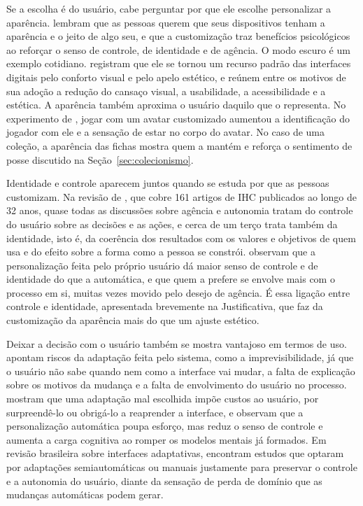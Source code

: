 Se a escolha é do usuário, cabe perguntar por que ele escolhe personalizar a aparência.  lembram que as pessoas querem que seus
dispositivos tenham a aparência e o jeito de algo seu, e que a customização traz benefícios psicológicos ao reforçar o senso de controle, de identidade e de
agência. O modo escuro é um exemplo cotidiano.  registram que ele se tornou um recurso padrão das interfaces digitais pelo conforto visual e
pelo apelo estético, e  reúnem entre os motivos de sua adoção a redução do cansaço visual, a usabilidade, a acessibilidade e a
estética. A aparência também aproxima o usuário daquilo que o representa. No experimento de , jogar com um avatar customizado aumentou a
identificação do jogador com ele e a sensação de estar no corpo do avatar. No caso de uma coleção, a aparência das fichas mostra quem a mantém e reforça o
sentimento de posse discutido na Seção~\ref{sec:colecionismo}.

Identidade e controle aparecem juntos quando se estuda por que as pessoas customizam. Na revisão de , que cobre 161 artigos de IHC
publicados ao longo de 32 anos, quase todas as discussões sobre agência e autonomia tratam do controle do usuário sobre as decisões e as ações, e cerca de um
terço trata também da identidade, isto é, da coerência dos resultados com os valores e objetivos de quem usa e do efeito sobre a forma como a pessoa se
constrói.  observam que a personalização feita pelo próprio usuário dá maior senso de controle e de identidade do que a automática, e que
quem a prefere se envolve mais com o processo em si, muitas vezes movido pelo desejo de agência. É essa ligação entre controle e identidade, apresentada
brevemente na Justificativa, que faz da customização da aparência mais do que um ajuste estético.

Deixar a decisão com o usuário também se mostra vantajoso em termos de uso.  apontam riscos da adaptação feita pelo sistema, como a
imprevisibilidade, já que o usuário não sabe quando nem como a interface vai mudar, a falta de explicação sobre os motivos da mudança e a falta de envolvimento
do usuário no processo.  mostram que uma adaptação mal escolhida impõe custos ao usuário, por surpreendê-lo ou obrigá-lo a reaprender a
interface, e  observam que a personalização automática poupa esforço, mas reduz o senso de controle e aumenta a carga cognitiva ao romper
os modelos mentais já formados. Em revisão brasileira sobre interfaces adaptativas,  encontram estudos que optaram por
adaptações semiautomáticas ou manuais justamente para preservar o controle e a autonomia do usuário, diante da sensação de perda de domínio que as mudanças
automáticas podem gerar.

